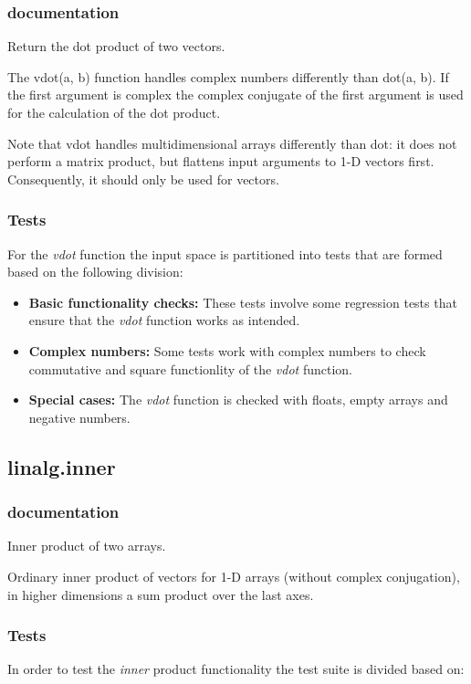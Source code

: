 \documentclass[a4paper,11pt]{article}
\begin{document}
\subsubsection{documentation}
Return the dot product of two vectors.

The vdot(a, b) function handles complex numbers differently than dot(a, b). If the first argument is complex the complex conjugate of the first argument is used for the calculation of the dot product.

Note that vdot handles multidimensional arrays differently than dot: it does not perform a matrix product, but flattens input arguments to 1-D vectors first. Consequently, it should only be used for vectors.

\subsubsection{Tests}


For the \textit{vdot} function the input space is partitioned into tests that are formed based on the following division:

\begin{itemize}
	\item \textbf{Basic functionality checks:} These tests involve some regression tests that ensure that the \textit{vdot} function works as intended.
	
	\item \textbf{Complex numbers:} Some tests work with complex numbers to check commutative and square functionlity of the \textit{vdot} function.
	
	\item \textbf{Special cases:} The \textit{vdot} function is checked with floats, empty arrays and negative numbers.
\end{itemize}


\subsection{linalg.inner}
\subsubsection{documentation}
Inner product of two arrays.

Ordinary inner product of vectors for 1-D arrays (without complex conjugation), in higher dimensions a sum product over the last axes.

\subsubsection{Tests}
In order to test the \textit{inner} product functionality the test suite is divided based on:
\end{document}
